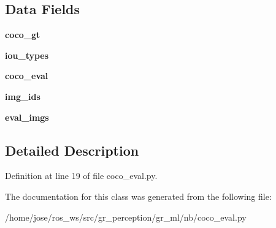 \subsection*{Data Fields}
\begin{DoxyCompactItemize}
\item 
\mbox{\label{classcoco__eval_1_1CocoEvaluator_a6987868c34b5bf53d8774c433fc8833f}} 
{\bfseries coco\+\_\+gt}
\item 
\mbox{\label{classcoco__eval_1_1CocoEvaluator_a25481d11fda96379c516b7208c8e1db3}} 
{\bfseries iou\+\_\+types}
\item 
\mbox{\label{classcoco__eval_1_1CocoEvaluator_aaa2a2013322b0aa33735adfce13ed96c}} 
{\bfseries coco\+\_\+eval}
\item 
\mbox{\label{classcoco__eval_1_1CocoEvaluator_a198602db0addb454258713886693f199}} 
{\bfseries img\+\_\+ids}
\item 
\mbox{\label{classcoco__eval_1_1CocoEvaluator_a9eb7b2893df5053fd7d100a78685080e}} 
{\bfseries eval\+\_\+imgs}
\end{DoxyCompactItemize}


\subsection{Detailed Description}


Definition at line 19 of file coco\+\_\+eval.\+py.



The documentation for this class was generated from the following file\+:\begin{DoxyCompactItemize}
\item 
/home/jose/ros\+\_\+ws/src/gr\+\_\+perception/gr\+\_\+ml/nb/coco\+\_\+eval.\+py\end{DoxyCompactItemize}
